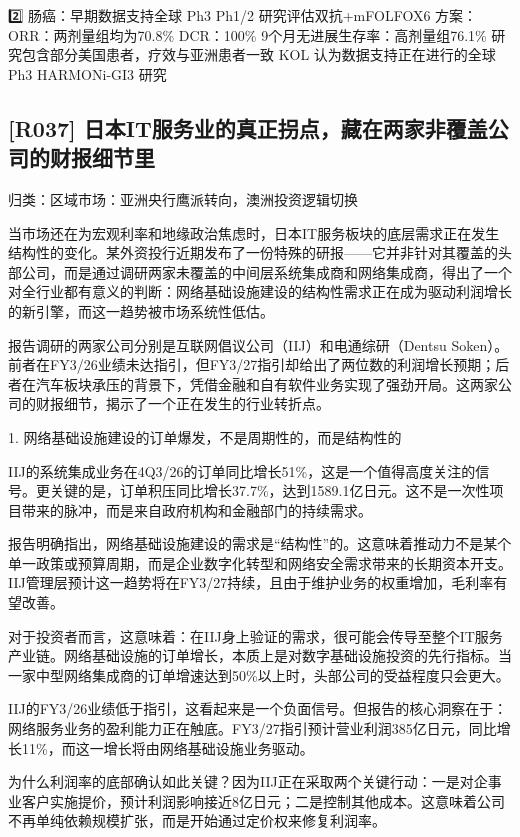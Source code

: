 \documentclass[11pt]{ctexart}
\begin{document}
2️⃣ 肠癌：早期数据支持全球 Ph3 Ph1/2 研究评估双抗+mFOLFOX6 方案： ORR：两剂量组均为70.8\% DCR：100\% 9个月无进展生存率：高剂量组76.1\% 研究包含部分美国患者，疗效与亚洲患者一致 KOL 认为数据支持正在进行的全球 Ph3 HARMONi-GI3 研究

\subsection{[R037] 日本IT服务业的真正拐点，藏在两家非覆盖公司的财报细节里}
{\small\color{refgray}归类：区域市场：亚洲央行鹰派转向，澳洲投资逻辑切换}

当市场还在为宏观利率和地缘政治焦虑时，日本IT服务板块的底层需求正在发生结构性的变化。某外资投行近期发布了一份特殊的研报——它并非针对其覆盖的头部公司，而是通过调研两家未覆盖的中间层系统集成商和网络集成商，得出了一个对全行业都有意义的判断：网络基础设施建设的结构性需求正在成为驱动利润增长的新引擎，而这一趋势被市场系统性低估。

报告调研的两家公司分别是互联网倡议公司（IIJ）和电通综研（Dentsu Soken）。前者在FY3/26业绩未达指引，但FY3/27指引却给出了两位数的利润增长预期；后者在汽车板块承压的背景下，凭借金融和自有软件业务实现了强劲开局。这两家公司的财报细节，揭示了一个正在发生的行业转折点。

1. 网络基础设施建设的订单爆发，不是周期性的，而是结构性的

IIJ的系统集成业务在4Q3/26的订单同比增长51\%，这是一个值得高度关注的信号。更关键的是，订单积压同比增长37.7\%，达到1589.1亿日元。这不是一次性项目带来的脉冲，而是来自政府机构和金融部门的持续需求。

报告明确指出，网络基础设施建设的需求是“结构性”的。这意味着推动力不是某个单一政策或预算周期，而是企业数字化转型和网络安全需求带来的长期资本开支。IIJ管理层预计这一趋势将在FY3/27持续，且由于维护业务的权重增加，毛利率有望改善。

对于投资者而言，这意味着：在IIJ身上验证的需求，很可能会传导至整个IT服务产业链。网络基础设施的订单增长，本质上是对数字基础设施投资的先行指标。当一家中型网络集成商的订单增速达到50\%以上时，头部公司的受益程度只会更大。

IIJ的FY3/26业绩低于指引，这看起来是一个负面信号。但报告的核心洞察在于：网络服务业务的盈利能力正在触底。FY3/27指引预计营业利润385亿日元，同比增长11\%，而这一增长将由网络基础设施业务驱动。

为什么利润率的底部确认如此关键？因为IIJ正在采取两个关键行动：一是对企事业客户实施提价，预计利润影响接近8亿日元；二是控制其他成本。这意味着公司不再单纯依赖规模扩张，而是开始通过定价权来修复利润率。
\end{document}
